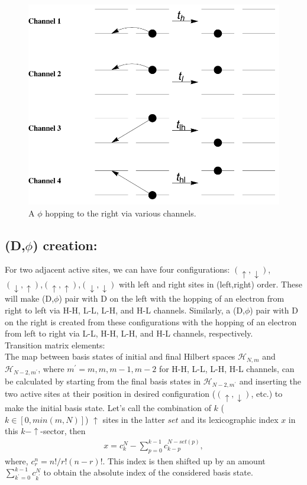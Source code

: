 \documentclass[a4paper,twocolumn]{revtex4-1} %
\newcommand{\da}{\downarrow}
\newcommand{\ua}{\uparrow}
\begin{document}
\begin{figure}[htpb]
  \centering
  \includegraphics[width=0.4\columnwidth]{PhihopsR}
  \caption{A $\phi$ hopping to the right via various channels.
 \label{fig:phihops}}  
\end{figure}



\subsection{(D,$\phi$) creation: }
For two adjacent active sites,
we can have four configurations:
$(\ua,\da)$, $(\da,\ua)$,$(\ua,\ua)$,$(\da,\da)$ with left and right sites in (left,right) order.
These will make (D,$\phi$) pair with D on the left 
with the hopping of an electron from right to left 
via H-H, L-L, L-H, and H-L channels.
Similarly,
a (D,$\phi$) pair with D on the right is created from these configurations
with the hopping of an electron from left to right
via L-L, H-H, L-H, and H-L channels, respectively.
\\Transition matrix elements:\\
The map between basis states of initial and final Hilbert spaces
$\mathcal{H}_{N,m}$ and $\mathcal{H}_{N-2,m^\prime}$, 
where $m^\prime=m,m,m-1,m-2$ for H-H, L-L, L-H, H-L channels,
can be calculated by starting from the final basis states in $\mathcal{H}_{N-2,m^\prime}$ 
and inserting the two active sites
at their position in desired configuration ($(\ua,\da)$, etc.) to make the initial basis state.
Let's call the combination of $k$ ($k\in [0,min(m,N)]$) $\ua$ sites in the latter $set$ and its lexicographic index
$x$ in this $k-\ua$-sector, then
\begin{eqnarray*}
x = c^N_ k - 
   \sum_{p=0}^{k-1}c^{N - set(p)}_{ k - p},
\end{eqnarray*}  
 where, $c^n_r = {n!}/{r!(n-r)!}$.
  This index is then shifted up by an amount 
$\sum_{k^\prime=0}^{k-1} c^N_{k^\prime}$ to obtain the absolute index of the considered basis state.
\end{document}
